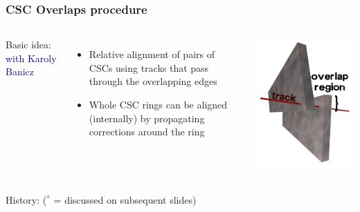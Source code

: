 \documentclass[compress]{beamer}
\begin{document}
\begin{frame}
\frametitle{CSC Overlaps procedure}
\small
\begin{columns}
Basic idea: \hfill \textcolor{darkblue}{with Karoly Banicz}
\begin{itemize}
\item Relative alignment of pairs of CSCs using tracks that pass through the overlapping edges
\item Whole CSC rings can be aligned (internally) by propagating corrections around the ring
\end{itemize}

\includegraphics[width=\linewidth]{overlaps.png}
\end{columns}

\vfill
\hspace{-0.4 cm} History: (\textcolor{red}{$^*$} = discussed on subsequent slides)


\end{frame}
\end{document}
